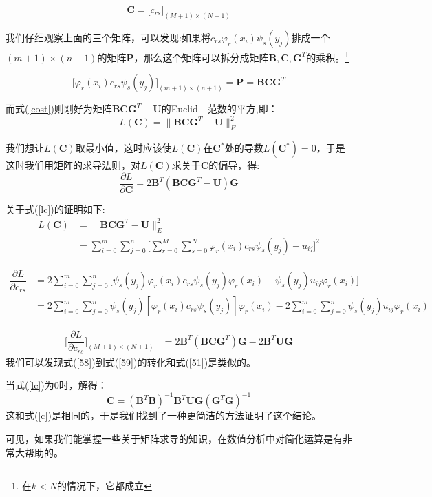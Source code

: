 \[\bm{C} =\big[c_{rs}\big]_{(M+1)\times (N+1)}\]

我们仔细观察上面的三个矩阵，可以发现:如果将$c_{rs}\varphi_{r}(x_i)\psi_{s}(y_j)$排成一个$(m+1)\times (n+1)$的矩阵$\bm{P}$，那么这个矩阵可以拆分成矩阵$\bm{B},\bm{C},\bm{G}^T$的乘积。\footnote{在$k<N$的情况下，它都成立}


\begin{equation}
\label{51}
\Big[\varphi_{r}(x_i)c_{rs}\psi_{s}(y_j) \Big]_{(m+1)\times (n+1)}=\bm{P}=\bm{B}\bm{C}\bm{G}^T
\end{equation}


而式(\ref{cost})则刚好为矩阵$\bm{B}\bm{C}\bm{G}^T-\bm{U}$的Euclid---范数的平方,即：
\begin{equation}
L(\bm{C})={\|{\bm{B}\bm{C}\bm{G}^T-\bm{U}}\|_{E}^2}
\end{equation}

我们想让$L(\bm{C})$取最小值，这时应该使$L(\bm{C})$在$\bm{C}^{\ast}$处的导数$L(\bm{C}^{\ast})=0$，于是
这时我们用矩阵的求导法则，对$L(\bm{C})$求关于$\bm{C}$的偏导，得:
\begin{equation}
\label{lc}
\boxed{
\dfrac{\partial L}{\partial \bm{C}}=2\bm{B}^T(\bm{B}\bm{C}\bm{G}^T-\bm{U})\bm{G}}
\end{equation}



关于式(\ref{lc})的证明如下:
\begin{align}
L(\bm{C})&={\|{\bm{B}\bm{C}\bm{G}^T-\bm{U}}\|_{E}^2}\\
&=\sum\limits_{i = 0}^{m} {\sum\limits_{j = 0}^{n} \Bigg[{\sum_{r = 0}^M \sum_{s = 0}^N 
\varphi_{r}(x_i)c_{rs}\psi_{s}(y_j) - u_{ij}}\Bigg]^2} 
\end{align}

\begin{align}
\dfrac{\partial L}{\partial c_{rs}}&=
2\sum\limits_{i = 0}^{m} \sum\limits_{j = 0}^{n} \Big[\psi_{s}(y_j)\varphi_{r}(x_i)c_{rs}\psi_{s}(y_j)\varphi_{r}(x_i)-\psi_{s}(y_j) u_{ij}\varphi_{r}(x_i)\Big] \\
&=
2\sum\limits_{i = 0}^{m} \sum\limits_{j = 0}^{n} \psi_{s}(y_j)[\varphi_{r}(x_i)c_{rs}\psi_{s}(y_j)]\varphi_{r}(x_i)-
2\sum\limits_{i = 0}^{m} \sum\limits_{j = 0}^{n}\psi_{s}(y_j) u_{ij}\varphi_{r}(x_i)
\label{58}
\end{align}

\begin{align}
\label{59}
\Big[\dfrac{\partial L}{\partial c_{rs}}\Big]_{(M+1)\times (N+1)}&=2\bm{B}^T(\bm{B}\bm{C}\bm{G}^T)\bm{G}-2\bm{B}^T\bm{U}\bm{G}
\end{align}
我们可以发现式(\ref{58})到式(\ref{59})的转化和式(\ref{51})是类似的。

当式(\ref{lc})为0时，解得：
\begin{equation}
\label{cc}
\bm{C}=(\bm{B}^T\bm{B})^{-1}\bm{B}^T\bm{U}\bm{G}(\bm{G}^T\bm{G})^{-1}
\end{equation}
这和式(\ref{c})是相同的，于是我们找到了一种更简洁的方法证明了这个结论。


可见，如果我们能掌握一些关于矩阵求导的知识，在数值分析中对简化运算是有非常大帮助的。


